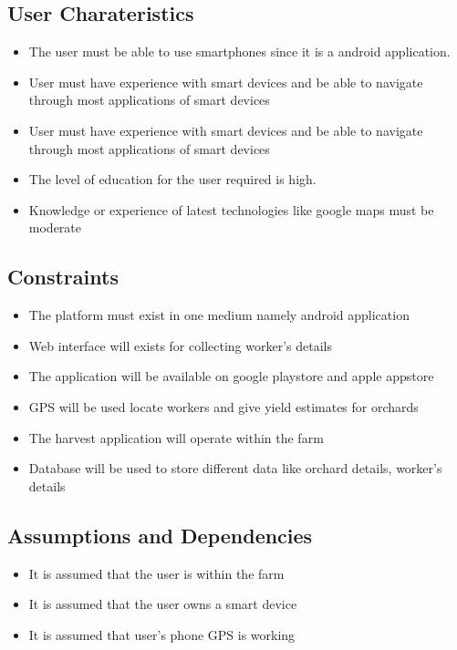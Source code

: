 \documentclass[runningheads,a4paper]{article}
\begin{document}
		\subsection{User Charateristics}
			\begin{itemize}	
			\item The user must be able to use smartphones since 
			it is a android application.
			\item	User must have experience with smart devices and 
			be able to navigate through most applications of smart devices
			\item	User must have experience with smart devices and be able to navigate through most applications of smart devices
			\item	The level of education for the user required is high.
			\item Knowledge or experience of latest technologies like google maps
			must be moderate
		\end{itemize}

		\subsection{Constraints}
		\begin{itemize}
		\item	The platform must exist in one medium namely android application
		\item Web interface will exists for collecting worker's details
		\item The application will be available on google playstore and apple appstore
		\item GPS will be used locate workers and give yield estimates for orchards
		\item The harvest application will operate within the farm
		\item Database will be used to store different data like
		orchard details, worker's details
	\end{itemize}

		\subsection{Assumptions and Dependencies}
			\begin{itemize}
				
			\item	It is assumed that the user is within the farm
			\item	It is assumed that the user owns a smart device
			\item	It is assumed that user's phone GPS is working
		\end{itemize}
\end{document}
